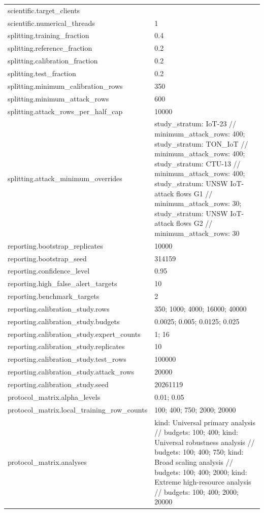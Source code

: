 \begin{tabular}{ll}
scientific.target\_clients &  \\
scientific.numerical\_threads & 1 \\
splitting.training\_fraction & 0.4 \\
splitting.reference\_fraction & 0.2 \\
splitting.calibration\_fraction & 0.2 \\
splitting.test\_fraction & 0.2 \\
splitting.minimum\_calibration\_rows & 350 \\
splitting.minimum\_attack\_rows & 600 \\
splitting.attack\_rows\_per\_half\_cap & 10000 \\
splitting.attack\_minimum\_overrides & study\_stratum: IoT-23 // minimum\_attack\_rows: 400; study\_stratum: TON\_IoT // minimum\_attack\_rows: 400; study\_stratum: CTU-13 // minimum\_attack\_rows: 400; study\_stratum: UNSW IoT-attack flows G1 // minimum\_attack\_rows: 30; study\_stratum: UNSW IoT-attack flows G2 // minimum\_attack\_rows: 30 \\
reporting.bootstrap\_replicates & 10000 \\
reporting.bootstrap\_seed & 314159 \\
reporting.confidence\_level & 0.95 \\
reporting.high\_false\_alert\_targets & 10 \\
reporting.benchmark\_targets & 2 \\
reporting.calibration\_study.rows & 350; 1000; 4000; 16000; 40000 \\
reporting.calibration\_study.budgets & 0.0025; 0.005; 0.0125; 0.025 \\
reporting.calibration\_study.expert\_counts & 1; 16 \\
reporting.calibration\_study.replicates & 10 \\
reporting.calibration\_study.test\_rows & 100000 \\
reporting.calibration\_study.attack\_rows & 20000 \\
reporting.calibration\_study.seed & 20261119 \\
protocol\_matrix.alpha\_levels & 0.01; 0.05 \\
protocol\_matrix.local\_training\_row\_counts & 100; 400; 750; 2000; 20000 \\
protocol\_matrix.analyses & kind: Universal primary analysis // budgets: 100; 400; kind: Universal robustness analysis // budgets: 100; 400; 750; kind: Broad scaling analysis // budgets: 100; 400; 2000; kind: Extreme high-resource analysis // budgets: 100; 400; 2000; 20000 \\

\end{tabular}
